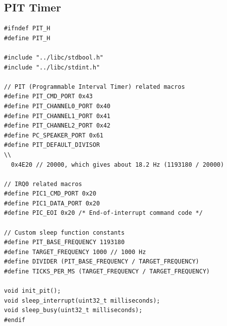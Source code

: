 \documentclass[../main.tex]{subfiles}
\begin{document}
\subsection{PIT Timer}
\label{apx:pit_timer}


\label{lst:pit_h}
\begin{verbatim}
#ifndef PIT_H
#define PIT_H

#include "../libc/stdbool.h"
#include "../libc/stdint.h"

// PIT (Programmable Interval Timer) related macros
#define PIT_CMD_PORT 0x43
#define PIT_CHANNEL0_PORT 0x40
#define PIT_CHANNEL1_PORT 0x41
#define PIT_CHANNEL2_PORT 0x42
#define PC_SPEAKER_PORT 0x61
#define PIT_DEFAULT_DIVISOR                                                    \\
  0x4E20 // 20000, which gives about 18.2 Hz (1193180 / 20000)

// IRQ0 related macros
#define PIC1_CMD_PORT 0x20
#define PIC1_DATA_PORT 0x20
#define PIC_EOI 0x20 /* End-of-interrupt command code */

// Custom sleep function constants
#define PIT_BASE_FREQUENCY 1193180
#define TARGET_FREQUENCY 1000 // 1000 Hz
#define DIVIDER (PIT_BASE_FREQUENCY / TARGET_FREQUENCY)
#define TICKS_PER_MS (TARGET_FREQUENCY / TARGET_FREQUENCY)

void init_pit();
void sleep_interrupt(uint32_t milliseconds);
void sleep_busy(uint32_t milliseconds);
#endif

\end{verbatim}
\end{document}
